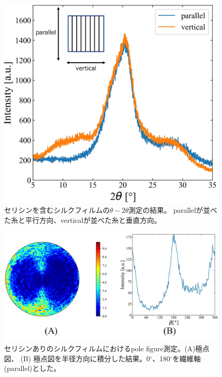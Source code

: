 \documentclass[dvipdfmx,12pt,a4paper]{jreport}
\begin{document}
			\begin{figure}[H]
				\centering
				\includegraphics[scale=0.65]{theta_2theta_セリシンあり.jpg}
				\caption{セリシンを含むシルクフィルムの$\theta - 2\theta$測定の結果。
				parallelが並べた糸と平行方向、verticalが並べた糸と垂直方向。}
				\label{セリシン含む_theta_2theta}
			\end{figure}
			\newpage
			\begin{figure}[h]
				\centering
				\includegraphics[width=\linewidth]{セリシンあり_polefigure.jpg}
				\caption{セリシンありのシルクフィルムにおけるpole figure測定。(A)極点図、
				(B) 極点図を半径方向に積分した結果。0$^{\circ}$、180$^{\circ}$を繊維軸(parallel)とした。}
				\label{セリシン含む_pole_figure}
			\end{figure}
			\newpage
\end{document}
